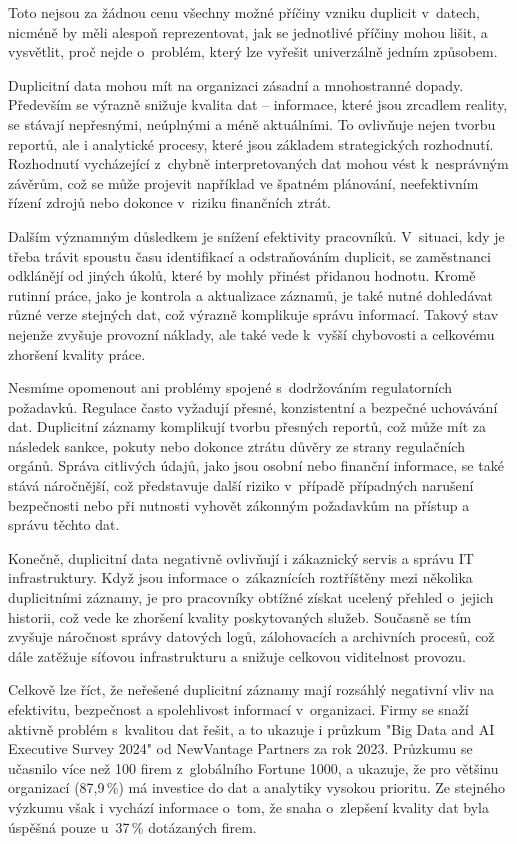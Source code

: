Toto nejsou za žádnou cenu všechny možné příčiny vzniku duplicit v~datech, nicméně by měli alespoň reprezentovat, jak se jednotlivé příčiny mohou lišit, a vysvětlit, proč nejde o~problém, který lze vyřešit univerzálně jedním způsobem.



Duplicitní data mohou mít na organizaci zásadní a mnohostranné dopady. Především se výrazně snižuje kvalita dat – informace, které jsou zrcadlem reality, se stávají nepřesnými, neúplnými a méně aktuálními. To ovlivňuje nejen tvorbu reportů, ale i analytické procesy, které jsou základem strategických rozhodnutí. Rozhodnutí vycházející z~chybně interpretovaných dat mohou vést k~nesprávným závěrům, což se může projevit například ve špatném plánování, neefektivním řízení zdrojů nebo dokonce v~riziku finančních ztrát.

Dalším významným důsledkem je snížení efektivity pracovníků. V~situaci, kdy je třeba trávit spoustu času identifikací a odstraňováním duplicit, se zaměstnanci odklánějí od jiných úkolů, které by mohly přinést přidanou hodnotu. Kromě rutinní práce, jako je kontrola a aktualizace záznamů, je také nutné dohledávat různé verze stejných dat, což výrazně komplikuje správu informací. Takový stav nejenže zvyšuje provozní náklady, ale také vede k~vyšší chybovosti a celkovému zhoršení kvality práce.

Nesmíme opomenout ani problémy spojené s~dodržováním regulatorních požadavků. Regulace často vyžadují přesné, konzistentní a bezpečné uchovávání dat. Duplicitní záznamy komplikují tvorbu přesných reportů, což může mít za následek sankce, pokuty nebo dokonce ztrátu důvěry ze strany regulačních orgánů. Správa citlivých údajů, jako jsou osobní nebo finanční informace, se také stává náročnější, což představuje další riziko v~případě případných narušení bezpečnosti nebo při nutnosti vyhovět zákonným požadavkům na přístup a správu těchto dat.

Konečně, duplicitní data negativně ovlivňují i zákaznický servis a správu IT infrastruktury. Když jsou informace o~zákaznících roztříštěny mezi několika duplicitními záznamy, je pro pracovníky obtížné získat ucelený přehled o~jejich historii, což vede ke zhoršení kvality poskytovaných služeb. Současně se tím zvyšuje náročnost správy datových logů, zálohovacích a archivních procesů, což dále zatěžuje síťovou infrastrukturu a snižuje celkovou viditelnost provozu.

Celkově lze říct, že neřešené duplicitní záznamy mají rozsáhlý negativní vliv na efektivitu, bezpečnost a spolehlivost informací v~organizaci. Firmy se snaží aktivně problém s~kvalitou dat řešit, a to ukazuje i průzkum "Big Data and AI Executive Survey 2024" od NewVantage Partners za rok 2023. Průzkumu se učasnilo více než 100 firem z~globálního Fortune 1000, a ukazuje, že pro většinu organizací (87,9\,\%) má investice do dat a analytiky vysokou prioritu. Ze stejného výzkumu však i vychází informace o~tom, že snaha o~zlepšení kvality dat byla úspěšná pouze u~37\,\% dotázaných firem.

